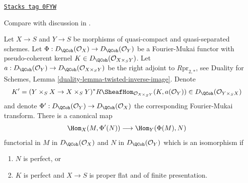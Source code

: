 \begin{lemma}
\label{equiv-lemma-fourier-mukai-right-adjoint}
\href{https://stacks.math.columbia.edu/tag/0FYW}{\texttt{Stacks tag 0FYW}}

\begin{reference}
Compare with discussion in \cite{Rizzardo}.
\end{reference}
Let $X \to S$ and $Y \to S$ be morphisms of quasi-compact and quasi-separated
schemes. Let $\Phi : D_\QCoh(\mathcal{O}_X) \to D_\QCoh(\mathcal{O}_Y)$
be a Fourier-Mukai functor with pseudo-coherent kernel
$K \in D_\QCoh(\mathcal{O}_{X \times_S Y})$.
Let $a : D_\QCoh(\mathcal{O}_Y) \to  D_\QCoh(\mathcal{O}_{X \times_S Y})$
be the right adjoint to $R\text{pr}_{2, *}$, see
Duality for Schemes, Lemma \ref{duality-lemma-twisted-inverse-image}.
Denote
$$
K' = (Y \times_S X \to X \times_S Y)^*
R\SheafHom_{\mathcal{O}_{X \times_S Y}}(K, a(\mathcal{O}_Y)) \in
D_\QCoh(\mathcal{O}_{Y \times_S X})
$$
and denote $\Phi' : D_\QCoh(\mathcal{O}_Y) \to D_\QCoh(\mathcal{O}_X)$
the corresponding Fourier-Mukai transform. There is a canonical map
$$
\Hom_X(M, \Phi'(N)) \longrightarrow \Hom_Y(\Phi(M), N)
$$
functorial in $M$ in $D_\QCoh(\mathcal{O}_X)$ and $N$ in
$D_\QCoh(\mathcal{O}_Y)$ which is an isomorphism if
\begin{enumerate}
\item $N$ is perfect, or
\item $K$ is perfect and $X \to S$ is proper flat and of finite presentation.
\end{enumerate}
\end{lemma}


